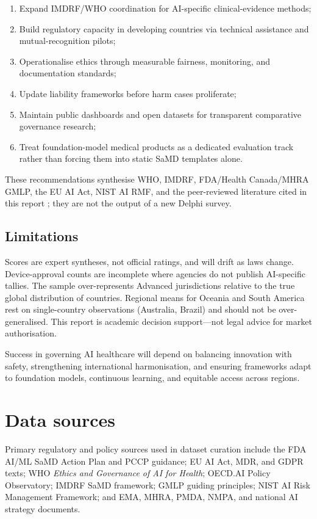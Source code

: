 \documentclass[12pt,a4paper]{report}
\begin{document}
\begin{enumerate}
  \item Expand IMDRF/WHO coordination for AI-specific clinical-evidence methods;
  \item Build regulatory capacity in developing countries via technical assistance and mutual-recognition pilots;
  \item Operationalise ethics through measurable fairness, monitoring, and documentation standards;
  \item Update liability frameworks before harm cases proliferate;
  \item Maintain public dashboards and open datasets for transparent comparative governance research;
  \item Treat foundation-model medical products as a dedicated evaluation track rather than forcing them into static SaMD templates alone.
\end{enumerate}

These recommendations synthesise WHO, IMDRF, FDA/Health Canada/MHRA GMLP, the EU AI Act, NIST AI RMF, and the peer-reviewed literature cited in this report \cite{who2021,imdrf2014,gmlp2021,euaiact2024,nistairmf}; they are not the output of a new Delphi survey.

\section{Limitations}

Scores are expert syntheses, not official ratings, and will drift as laws change. Device-approval counts are incomplete where agencies do not publish AI-specific tallies. The sample over-represents Advanced jurisdictions relative to the true global distribution of countries. Regional means for Oceania and South America rest on single-country observations (Australia, Brazil) and should not be over-generalised. This report is academic decision support---not legal advice for market authorisation.

Success in governing AI healthcare will depend on balancing innovation with safety, strengthening international harmonisation, and ensuring frameworks adapt to foundation models, continuous learning, and equitable access across regions.

\chapter*{Data sources}

Primary regulatory and policy sources used in dataset curation include the FDA AI/ML SaMD Action Plan and PCCP guidance; EU AI Act, MDR, and GDPR texts; WHO \emph{Ethics and Governance of AI for Health}; OECD.AI Policy Observatory; IMDRF SaMD framework; GMLP guiding principles; NIST AI Risk Management Framework; and EMA, MHRA, PMDA, NMPA, and national AI strategy documents.

\printbibliography[heading=bibintoc,title={References}]
\end{document}
